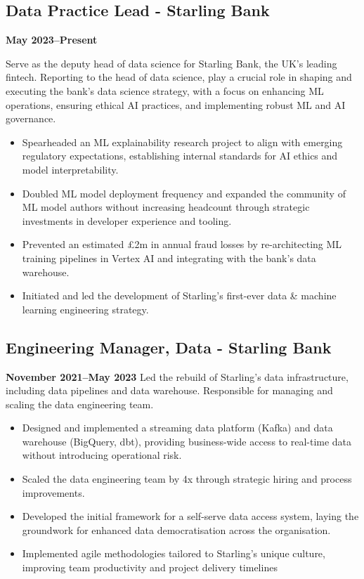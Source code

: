 \documentclass[a4paper]{scrartcl}
\begin{document}
\subsection*{Data Practice Lead - Starling Bank}
\textbf{May 2023--Present}

Serve as the deputy head of data science for Starling Bank, the UK's leading fintech. Reporting to the head of data science, play a crucial role in shaping and executing the bank's data science strategy, with a focus on enhancing ML operations, ensuring ethical AI practices, and implementing robust ML and AI governance.
\begin{itemize}
	\item Spearheaded an ML explainability research project to align with emerging regulatory expectations, establishing internal standards for AI ethics and model interpretability.
	\item Doubled ML model deployment frequency and expanded the community of ML model authors without increasing headcount through strategic investments in developer experience and tooling.
	\item Prevented an estimated £2m in annual fraud losses by re-architecting ML training pipelines in Vertex AI and integrating with the bank's data warehouse.
	\item Initiated and led the development of Starling's first-ever data \& machine learning engineering strategy.
\end{itemize}

\subsection*{Engineering Manager, Data - Starling Bank}
\textbf{November 2021--May 2023}
Led the rebuild of Starling's data infrastructure, including data pipelines and data warehouse. Responsible for managing and scaling the data engineering team.
\begin{itemize}
	\item Designed and implemented a streaming data platform (Kafka) and data warehouse (BigQuery, dbt), providing business-wide access to real-time data without introducing operational risk.
	\item Scaled the data engineering team by 4x through strategic hiring and process improvements.
	\item Developed the initial framework for a self-serve data access system, laying the groundwork for enhanced data democratisation across the organisation.
	\item Implemented agile methodologies tailored to Starling's unique culture, improving team productivity and project delivery timelines
\end{itemize}
\end{document}
